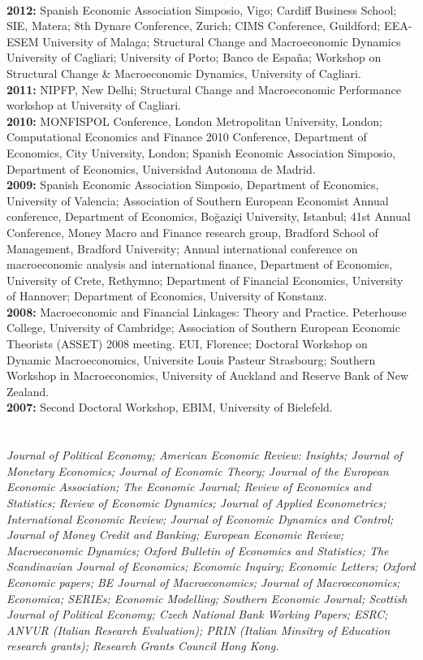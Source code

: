 \documentclass[margin, 11pt]{res} %
\begin{document}
\begin{resume}
\\
\textbf{2012:} {Spanish Economic Association Simposio, Vigo; Cardiff Business School; SIE, Matera; 8th Dynare Conference, Zurich; CIMS Conference, Guildford; EEA-ESEM University of Malaga; Structural Change and Macroeconomic Dynamics University of Cagliari; University of Porto; Banco de Espa\~{n}a; Workshop on Structural Change \& Macroeconomic Dynamics, University of Cagliari.}
\\
\textbf{2011:} {NIPFP, New Delhi; Structural Change and Macroeconomic Performance workshop at University of 
Cagliari.}
\\
\textbf{2010:} {MONFISPOL Conference, London Metropolitan University, London; Computational Economics and Finance 2010 Conference, Department of Economics,  City University, London; Spanish Economic Association Simposio, Department of Economics,  Universidad Autonoma de Madrid. }
\\
\textbf{2009:} {Spanish Economic Association Simposio, Department of Economics,  University of Valencia; Association of Southern European Economist Annual conference, Department of Economics, Bo\u{g}azi\c{c}i University, Istanbul; 41st Annual Conference, Money Macro and Finance research group, Bradford School of Management, Bradford University; Annual international conference on macroeconomic analysis and international finance, Department of Economics, University of Crete, Rethymno; Department of Financial Economics, University of Hannover; Department of Economics, University of Konstanz.}
\\
\textbf{2008:} {Macroeconomic and Financial Linkages: Theory and Practice. Peterhouse College, University of Cambridge; Association of Southern European Economic Theorists (ASSET) 2008 meeting. EUI, Florence; Doctoral Workshop on Dynamic Macroeconomics, Universite Louis Pasteur Strasbourg; Southern Workshop in Macroeconomics, University of Auckland and Reserve Bank of New Zealand.}
\\
\textbf{2007:} {Second Doctoral Workshop, EBIM, University of Bielefeld.}


\section{}
\emph{Journal of Political Economy; American Economic Review: Insights; Journal of Monetary Economics; Journal of Economic Theory; Journal of the European Economic Association; The Economic Journal; Review of Economics and Statistics; Review of Economic Dynamics; Journal of Applied Econometrics; International Economic Review; Journal of Economic Dynamics and Control; Journal of Money Credit and Banking; European Economic Review; Macroeconomic Dynamics; Oxford Bulletin of Economics and Statistics; The Scandinavian Journal of Economics; Economic Inquiry; Economic Letters; Oxford Economic papers; BE Journal of Macroeconomics; Journal of Macroeconomics; Economica; SERIEs; Economic Modelling; Southern Economic Journal; Scottish Journal of Political Economy; Czech National Bank Working Papers; ESRC; ANVUR (Italian Research Evaluation); PRIN (Italian Minsitry of Education research grants);  Research Grants Council Hong Kong.}



\end{resume}
\end{document}
